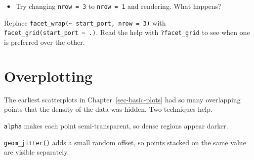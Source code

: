 \documentclass[
  english,
  letterpaper,
]{book}
\providecommand{\tightlist}{%
  \setlength{\itemsep}{0pt}\setlength{\parskip}{0pt}}
\begin{document}
\begin{itemize}
\tightlist
\item
  Try changing \texttt{nrow\ =\ 3} to \texttt{nrow\ =\ 1} and rendering.
  What happens?
\end{itemize}

\begin{tcolorbox}[enhanced jigsaw, colframe=quarto-callout-tip-color-frame, breakable, left=2mm, leftrule=.75mm, toptitle=1mm, rightrule=.15mm, opacitybacktitle=0.6, arc=.35mm, colback=white, title=\textcolor{quarto-callout-tip-color}{\faLightbulb}\hspace{0.5em}{Activity}, coltitle=black, colbacktitle=quarto-callout-tip-color!10!white, toprule=.15mm, bottomtitle=1mm, opacityback=0, titlerule=0mm, bottomrule=.15mm]

Replace
\texttt{facet\_wrap(\textasciitilde{}\ start\_port,\ nrow\ =\ 3)} with
\texttt{facet\_grid(start\_port\ \textasciitilde{}\ .)}. Read the help
with \texttt{?facet\_grid} to see when one is preferred over the other.

\end{tcolorbox}

\section{Overplotting}\label{sec-overplotting}

The earliest scatterplots in Chapter~\ref{sec-basic-plots} had so many
overlapping points that the density of the data was hidden. Two
techniques help.

\texttt{alpha} makes each point semi-transparent, so dense regions
appear darker.

\texttt{geom\_jitter()} adds a small random offset, so points stacked on
the same value are visible separately.
\end{document}
